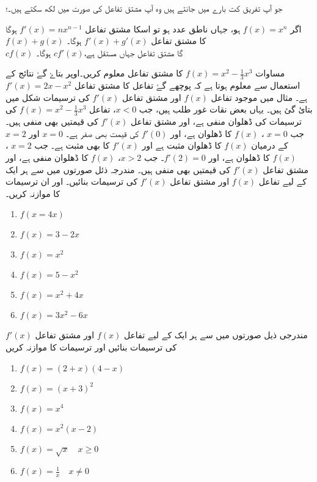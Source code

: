 جو آپ تفریق کت بارے میں جانتے ہیں وہ آپ مشتق تفاعل کی صورت میں لکھ سکتے ہیں۔؛

اگر \(f(x)=x^n\) ہو، جہاں  ناطق عدد ہو تو اسکا مشتق تفاعل \(f'(x)=nx^{n-1}\) ہوگا\\  \(f(x)+g(x)\) کا مشتق تفاعل \(f'(x)+g'(x)\) ہوگا۔\\ \(cf(x)\) گا مشتق تفاعل جہاں  مستقل ہے،\(cf'(x)\) ہوگا۔

مساوات \(f(x)=x^2-\frac{1}{3}x^3\) کا مشتق تفاعل معلوم کریں۔اوپر بتاۓ گۓ نتائج کے استعمال سے معلوم ہوتا ہے کہ پوچھے گۓ تفاعل کا مشتق تفاعل \(f'(x)=2x-x^2\) ہے۔ مثال  میں موجود تفاعل \(f(x)\) اور مشتق تفاعل \(f'(x)\) کی ترسیمات شکل  میں بتائ گئ ہیں۔ یہاں بعض نقات غور طلب ہیں، جب \(x<0\)، تفاعل \(f(x)=x^2-\frac{1}{3}x^3\) کی ترسیمات کی ڈھلوان منفی ہے، اور مشتق تفاعل \(f'(x)\)  کی قیمتیں بھی منفی ہیں۔ جب \(x=0\) ، \(f(x)\) کا ڈھلوان  ہے، اور \(f'(0)\) کی قیمت بھی صفر ہے۔ \(x=0\) اور \(x=2\) کے درمیان \(f(x)\) کا ڈھلوان مثبت ہے اور \(f'(x)\) کا بھی مثبت ہے۔ جب \(x=2\) ، \(f(x)\) کا ڈھلوان  ہے، اور \(f'(2)=0\)۔ جب \(x>2\)، \(f(x)\) کا ڈھلوان منفی ہے، اور مشتق تفاعل \(f'(x)\) کی قیمتیں بھی منفی ہیں۔
مندرجہ ذئل صورتوں میں سے ہر ایک کے لیے تفاعل  \(f(x)\)  اور مشتق تفاعل \(f'(x)\) کی ترسیمات بنائیں۔ اور ان ترسیمات کا موازنہ کریں۔
\begin{multicols}{3}
\begin{enumerate}[.a]
\item \(f(x=4x)\)
\item \(f(x)=3-2x\)
\item \(f(x)=x^2\)
\item \(f(x)=5-x^2\)
\item \(f(x)=x^2+4x\)
\item \(f(x)=3x^2-6x\)
\end{enumerate}
\end{multicols}
مندرجی ذیل صورتوں میں سے ہر ایک کے لیے تفاعل  \(f(x)\)  اور مشتق تفاعل \(f'(x)\) کی ترسیمات بنائیں اور ترسیمات کا موازنہ کریں 
\begin{multicols}{3}
\begin{enumerate}[.a]
\item \(f(x)=(2+x)(4-x)\)
\item \(f(x)=(x+3)^2\)
\item \(f(x)=x^4\)
\item \(f(x)=x^2(x-2)\)
\item \(f(x)=\sqrt{x} \quad x \geq 0 \)
\item \(f(x)=\frac{1}{x} \quad x \neq 0\)
\end{enumerate}
\end{multicols}
